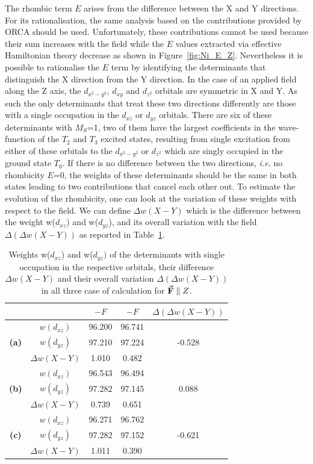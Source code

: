 \documentclass[12pt]{report}
\numberwithin{equation}{section}
\begin{document}
The rhombic term $E$ arises from the difference between the X and Y directions. For its rationalisation, the same analysis based on the contributions provided by ORCA should be used.
Unfortunately, these contributions cannot be used because their sum increases with the field while the $E$ values extracted via effective Hamiltonian theory decrease as shown in Figure~\ref{fig:Ni_E_Z}.
Nevertheless it is possible to rationalise the $E$ term by identifying the determinants that distinguish the X direction from the Y direction. 
In the case of an applied field along the Z axis, the $d_{x^2-y^2}$, $d_{xy}$ and $d_{z^2}$ orbitals are symmetric in X and Y. As such the only determinants that treat these two directions differently are those with a single occupation in the $d_{xz}$ or $d_{yz}$ orbitals.
There are six of these determinants with $M_S$=1, two of them have the largest coefficients in the wave-function of the $T_2$ and $T_3$ excited states, resulting from single excitation from either of these orbitals to the $d_{x^2-y^2}$ or $d_{z^2}$ which are singly occupied in the ground state $T_0$.
If there is no difference between the two directions, \textit{i.e.} no rhombicity $E$=0, the weights of these determinants should be the same in both states leading to two contributions that cancel each other out. 
To estimate the evolution of the rhombicity, one can look at the variation of these weights with respect to the field.
We can define $\Delta w(X-Y)$ which is the difference between the weight w($d_{xz}$) and w($d_{yz}$), and its overall variation with the field $\Delta (\Delta w(X-Y))$ as reported in Table~\ref{tab:PoidsZ}.

\begin{table}[h]
    \centering
    \begin{tabular}{c | c | c c | c }
        & &  $-F$ & $-F$ & $\Delta (\Delta w(X-Y))$\\
        \hline
        \multirow{3}{*}{\textbf{(a)}}
        &$w(d_{xz})$ &  96.200 & 96.741 & \\
        &$w(d_{yz})$ &  97.210 & 97.224 & -0.528\\
        &$\Delta w(X-Y)$ & 1.010 & 0.482& \\
        \hline
        \multirow{3}{*}{\textbf{(b)}}
        &$w(d_{xz})$ &  96.543 & 96.494 & \\
        &$w(d_{yz})$ &  97.282 & 97.145 & 0.088\\
        &$\Delta w(X-Y)$ & 0.739 & 0.651& \\
        \hline
        \multirow{3}{*}{\textbf{(c)}}
        &$w(d_{xz})$ &  96.271 & 96.762 & \\
        &$w(d_{yz})$ &  97.282 & 97.152 & -0.621\\
        &$\Delta w(X-Y)$ & 1.011 & 0.390& \\
        \hline
    \end{tabular}
    \caption{Weights w($d_{xz}$) and w($d_{yz})$ of the determinants with single occupation in the respective orbitals, their difference $\Delta w(X-Y)$ and their overall variation $\Delta (\Delta w(X-Y))$ in all three case of calculation for $\vec{\vb{F}}\parallel Z$. }
    \label{tab:PoidsZ}
\end{table}
\end{document}
